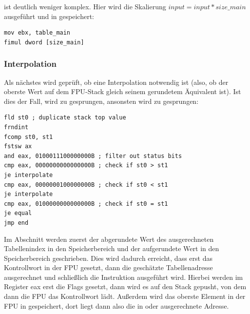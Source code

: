 \documentclass{article}
\begin{document}
	 ist deutlich weniger komplex. Hier
	wird die Skalierung $input = input*size\_main$ ausgeführt und
	 in  gespeichert:

\vspace{0.5cm}

\begin{lstlisting}
mov ebx, table_main
fimul dword [size_main]
\end{lstlisting}

\subsubsection{Interpolation}

	Als nächstes wird geprüft, ob eine Interpolation notwendig ist
	(also, ob der oberste Wert auf dem FPU-Stack gleich seinem
	gerundetem Äquivalent ist). Ist dies der Fall, wird zu
	 gesprungen, ansonsten wird
	zu  gesprungen:

\vspace{0.5cm}

\begin{lstlisting}
fld st0 ; duplicate stack top value
frndint
fcomp st0, st1
fstsw ax
and eax, 0100011100000000B ; filter out status bits
cmp eax, 0000000000000000B ; check if st0 > st1
je interpolate
cmp eax, 0000000100000000B ; check if st0 < st1
je interpolate
cmp eax, 0100000000000000B ; check if st0 = st1
je equal
jmp end
\end{lstlisting}

\vspace{0.5cm}

	Im Abschnitt  werden zuerst der
	abgerundete Wert des ausgerechneten Tabellenindex in den
	Speicherbereich  und der aufgerundete Wert in
	den Speicherbereich  geschrieben. Dies wird
	dadurch erreicht, dass erst das Kontrollwort in der FPU gesetzt, dann die geschätzte Tabellenadresse ausgerechnet
	und schließlich die Instruktion  ausgeführt
	wird. Hierbei werden im Register eax erst die Flags gesetzt,
	dann wird es auf den Stack gepusht, von dem dann die FPU das
	Kontrollwort lädt.  Außerdem wird das oberste Element in der
	FPU in  gespeichert, dort liegt dann also die
	in  oder  ausgerechnete
	Adresse.

\vspace{0.5cm}
\end{document}
